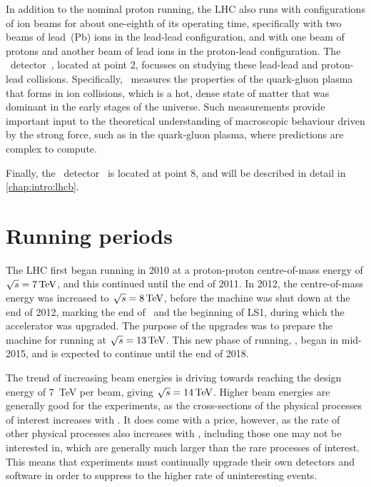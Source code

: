 In addition to the nominal proton running, the \ac{LHC} also runs with 
configurations of ion beams for about one-eighth of its operating time, 
specifically with two beams of lead~(Pb) ions in the lead-lead configuration, 
and with one beam of protons and another beam of lead ions in the proton-lead 
configuration.
The \alice\ detector~\cite{Aamodt:2008zz}, located at point 2, focusses on 
studying these lead-lead and proton-lead collisions.
Specifically, \alice\ measures the properties of the quark-gluon plasma that 
forms in ion collisions, which is a hot, dense state of matter that was 
dominant in the early stages of the universe.
Such measurements provide important input to the theoretical understanding of 
macroscopic behaviour driven by the strong force, such as in the quark-gluon 
plasma, where predictions are complex to compute.

Finally, the \lhcb\ detector~\cite{Alves:2008zz} is located at point 8, and 
will be described in detail in \cref{chap:intro:lhcb}.

\section{Running periods}

The \ac{LHC} first began running in 2010 at a proton-proton centre-of-mass 
energy of $\sqrts = \SI{7}{\TeV}$, and this continued until the end of 2011.
In 2012, the centre-of-mass energy was increased to $\sqrts = \SI{8}{\TeV}$, 
before the machine was shut down at the end of 2012, marking the end of 
\runone\ and the beginning of \ac{LS1}, during which the accelerator was 
upgraded.
The purpose of the upgrades was to prepare the machine for running at $\sqrts = 
\SI{13}{\TeV}$.
This new phase of running, \runtwo, began in mid-2015, and is expected to 
continue until the end of 2018.

The trend of increasing beam energies is driving towards reaching the design 
energy of \SI{7}{\TeV} per beam, giving $\sqrts = \SI{14}{\TeV}$.
Higher beam energies are generally good for the experiments, as the 
cross-sections of the physical processes of interest increases with \sqrts.
It does come with a price, however, as the rate of other physical processes 
also increases with \sqrts, including those one may not be interested in, which 
are generally much larger than the rare processes of interest.
This means that experiments must continually upgrade their own detectors and 
software in order to suppress to the higher rate of uninteresting events.
